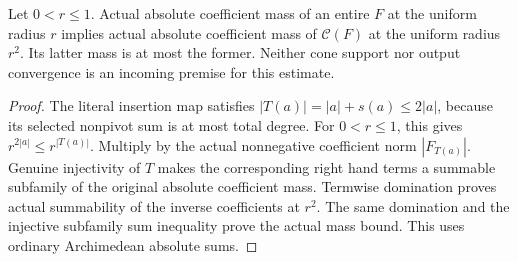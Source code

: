 \begin{theorem}
\label{hir:actual-zero-chart-coefficient-inverse-convergence}
\leanok
Let $0<r\le1$. Actual absolute coefficient mass of an entire $F$ at the
uniform radius $r$ implies actual absolute coefficient mass of $\mathcal C(F)$
at the uniform radius $r^2$. Its latter mass is at most the former. Neither
cone support nor output convergence is an incoming premise for this estimate.
\end{theorem}
\begin{proof}
The literal insertion map satisfies $|T(a)|=|a|+s(a)\le2|a|$, because its
selected nonpivot sum is at most total degree. For $0<r\le1$, this gives
$r^{2|a|}\le r^{|T(a)|}$. Multiply by the actual nonnegative coefficient
norm $|F_{T(a)}|$. Genuine injectivity of $T$ makes the corresponding right
hand terms a summable subfamily of the original absolute coefficient mass.
Termwise domination proves actual summability of the inverse coefficients
at $r^2$. The same domination and the injective subfamily sum inequality
prove the actual mass bound. This uses ordinary Archimedean absolute sums.
\end{proof}

